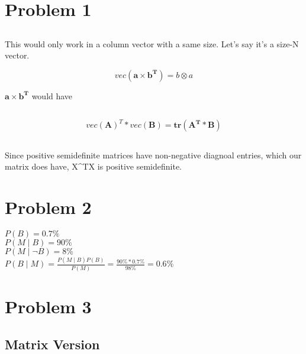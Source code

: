 \documentclass{article}
\newcommand{\matr}[1]{\mathbf{#1}}
\begin{document}
\section{Problem 1}
	\subsection{} %
	This would only work in a column vector with a same size. Let's say it's a size-N vector.

	\begin{equation*}
	vec(\matr{a} \times \matr{b^{T}}) = b \otimes a
	\end{equation*}

	$ \matr{a} \times \matr{b^{T}}$ would have 

	\subsection{} %

	\begin{equation*}
	vec(\matr{A})^{T} * vec(\matr{B}) = \matr{tr(\matr{A^{T}}*\matr{B})} 
	\end{equation*}	

	\subsection{} %
	Since positive semidefinite matrices have non-negative diagnoal entries, which our matrix does have, X^{T}X 
	is positive semidefinite.

\section {Problem 2}
	$P(B) = 0.7\%$\\
	$P(M \mid B) = 90\%$\\
	$P(M \mid \neg B) = 8\%$\\
	$P(B \mid M)  = \frac{P(M \mid B) P(B)}{P(M)} = \frac{90\% * 0.7\%}{98\%} = \mathbf{0.6\%}$

\section {Problem 3}
	\subsection{Matrix Version} %
		\subsubsection{} %
\end{document}
